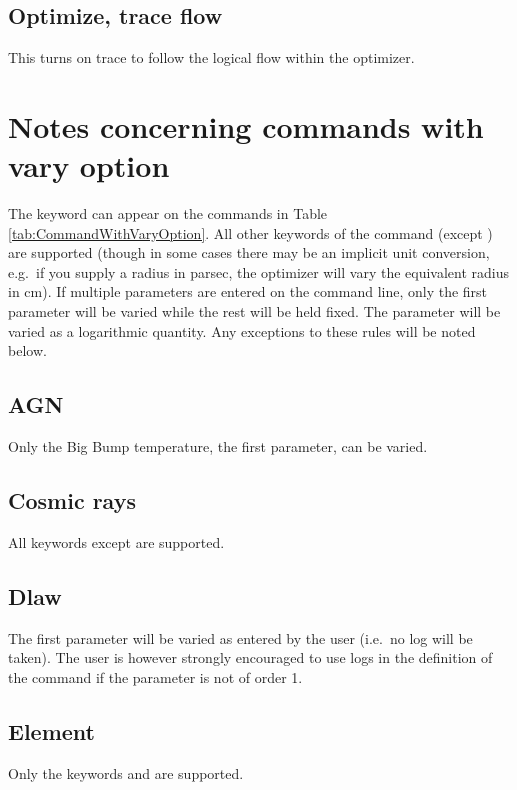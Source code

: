 \subsection{Optimize, trace flow}

This turns on trace to follow the logical flow within the optimizer.

\section{Notes concerning commands with vary option}
\label{sec:CommandWithVary_notes}

The keyword  can appear on the commands in Table
\ref{tab:CommandWithVaryOption}. All other keywords of the command (except
) are supported (though in some cases there may be an
implicit unit conversion, e.g.\ if you supply a radius in parsec, the
optimizer will vary the equivalent radius in cm). If multiple parameters are
entered on the command line, only the first parameter will be varied while the
rest will be held fixed. The parameter will be varied as a logarithmic
quantity. Any exceptions to these rules will be noted below.

\subsection{AGN}

Only the Big Bump temperature, the first parameter, can be varied.

\subsection{Cosmic rays}

All keywords except  are supported.

\subsection{Dlaw}

The first parameter will be varied as entered by the user (i.e.\ no log will
be taken). The user is however strongly encouraged to use logs in the
definition of the command if the parameter is not of order 1.

\subsection{Element}

Only the keywords  and  are supported.

